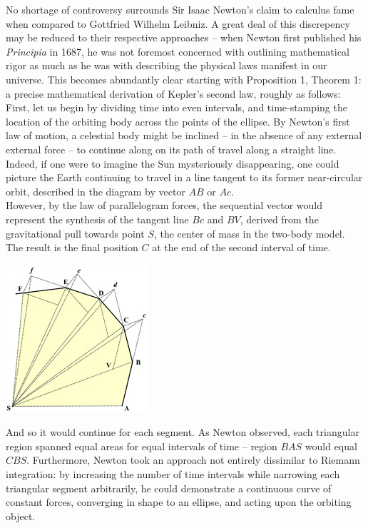 \documentclass{article}
\begin{document}
No shortage of controversy surrounds Sir Isaac Newton's claim to calculus fame when compared to Gottfried Wilhelm Leibniz. A great deal of this discrepency may be reduced to their respective approaches -- when Newton first published his \textit{Principia} in 1687, he was not foremost concerned with outlining mathematical rigor as much as he was with describing the physical laws manifest in our universe. This becomes abundantly clear starting with Proposition 1, Theorem 1: a precise mathematical derivation of Kepler's second law, roughly as follows: \\

First, let us begin by dividing time into even intervals, and time-stamping the location of the orbiting body across the points of the ellipse. By Newton's first law of motion, a celestial body might be inclined -- in the absence of any external external force -- to continue along on its path of travel along a straight line. Indeed, if one were to imagine the Sun mysteriously disappearing, one could picture the Earth continuing to travel in a line tangent to its former near-circular orbit, described in the diagram by vector $AB$ or $Ac$. \\

However, by the law of parallelogram forces, the sequential vector would represent the synthesis of the tangent line $Bc$ and $BV$, derived from the gravitational pull towards point $S$, the center of mass in the two-body model. The result is the final position $C$ at the end of the second interval of time.

\begin{center}
    \includegraphics[]{Keplers-Equal-Areas-Law-Newton-Fig.jpg}
\end{center}

And so it would continue for each segment. As Newton observed, each triangular region spanned equal areas for equal intervals of time -- region $BAS$ would equal $CBS$. Furthermore, Newton took an approach not entirely dissimilar to Riemann integration: by increasing the number of time intervals while narrowing each triangular segment arbitrarily, he could demonstrate a continuous curve of constant forces, converging in shape to an ellipse, and acting upon the orbiting object.
\end{document}

